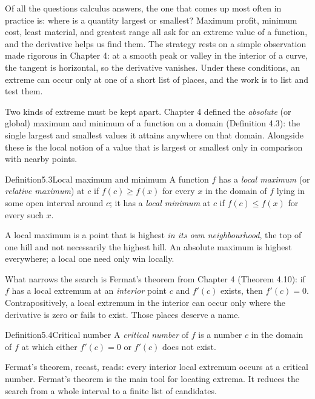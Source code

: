 \documentclass[a4paper,12pt,oneside]{memoir}
\begin{document}
Of all the questions calculus answers, the one that comes up most often in practice is: where is a quantity largest or smallest? Maximum profit, minimum cost, least material, and greatest range all ask for an extreme value of a function, and the derivative helps us find them. The strategy rests on a simple observation made rigorous in Chapter 4: at a smooth peak or valley in the interior of a curve, the tangent is horizontal, so the derivative vanishes. Under these conditions, an extreme can occur only at one of a short list of places, and the work is to list and test them.

Two kinds of extreme must be kept apart. Chapter 4 defined the \emph{absolute} (or global) maximum and minimum of a function on a domain (Definition 4.3): the single largest and smallest values it attains anywhere on that domain. Alongside these is the local notion of a value that is largest or smallest only in comparison with nearby points.

\begin{envdefinition}{Definition}{5.3}{Local maximum and minimum}
A function \(f\) has a \emph{local maximum} (or \emph{relative maximum}) at \(c\) if \(f(c) \ge f(x)\) for every \(x\) in the domain of \(f\) lying in some open interval around \(c\); it has a \emph{local minimum} at \(c\) if \(f(c) \le f(x)\) for every such \(x\).

\begin{informal}
A local maximum is a point that is highest \emph{in its own neighbourhood}, the top of one hill and not necessarily the highest hill. An absolute maximum is highest everywhere; a local one need only win locally.
\end{informal}
\end{envdefinition}
What narrows the search is Fermat’s theorem from Chapter 4 (Theorem 4.10): if \(f\) has a local extremum at an \emph{interior} point \(c\) and \(f'(c)\) exists, then \(f'(c) = 0\). Contrapositively, a local extremum in the interior can occur only where the derivative is zero or fails to exist. Those places deserve a name.

\begin{envdefinition}{Definition}{5.4}{Critical number}
A \emph{critical number} of \(f\) is a number \(c\) in the domain of \(f\) at which either \(f'(c) = 0\) or \(f'(c)\) does not exist.
\end{envdefinition}
Fermat’s theorem, recast, reads: every interior local extremum occurs at a critical number. Fermat’s theorem is the main tool for locating extrema. It reduces the search from a whole interval to a finite list of candidates.
\end{document}
